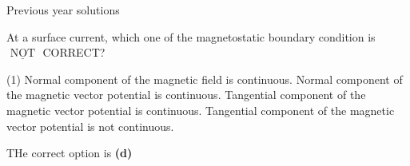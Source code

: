 \begin{center}
\end{center}
\newpage
\begin{abox}
	Previous year solutions
	\end{abox}
\begin{enumerate}
	\begin{minipage}{\textwidth}
		\item At a surface current, which one of the magnetostatic boundary condition is $\underline{\text { NOT }}$ CORRECT?
	\end{minipage}
	\begin{tasks}(1)
		\task[\textbf{A.}] Normal component of the magnetic field is continuous.
		\task[\textbf{B.}]Normal component of the magnetic vector potential is continuous.
		\task[\textbf{C.}]Tangential component of the magnetic vector potential is continuous.
		\task[\textbf{D.}]Tangential component of the magnetic vector potential is not continuous.
	\end{tasks}
	\begin{answer}
		THe correct option is \textbf{(d)}
	\end{answer}

\end{enumerate}

